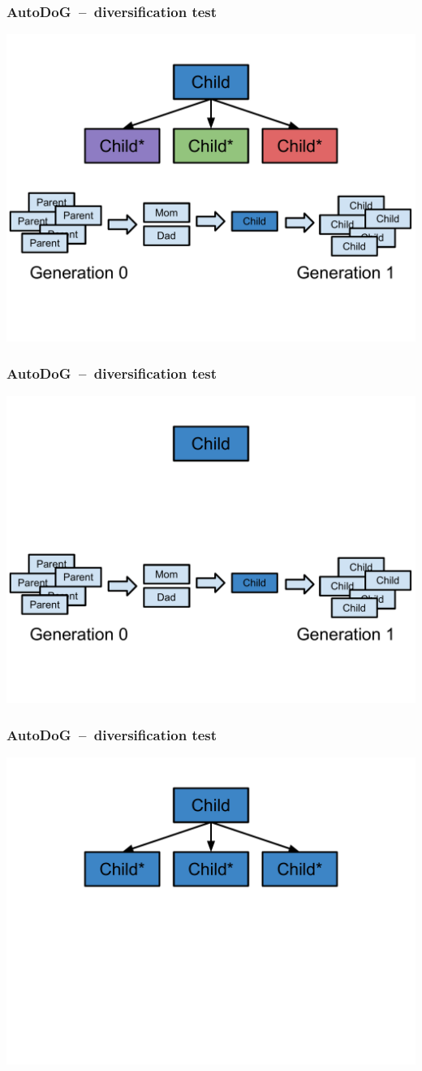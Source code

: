 \documentclass{beamer}
\begin{document}
\begin{frame}
	\frametitle{AutoDoG~--~diversification test}
	\includegraphics[width=.9\textwidth]{Illustrations/test_5.PDF}
\end{frame}

\begin{frame}
	\frametitle{AutoDoG~--~diversification test}
	\includegraphics[width=.9\textwidth]{Illustrations/test_6.PDF}
\end{frame}

\begin{frame}
	\frametitle{AutoDoG~--~diversification test}
	\includegraphics[width=.9\textwidth]{Illustrations/test_7.PDF}
\end{frame}
\end{document}
